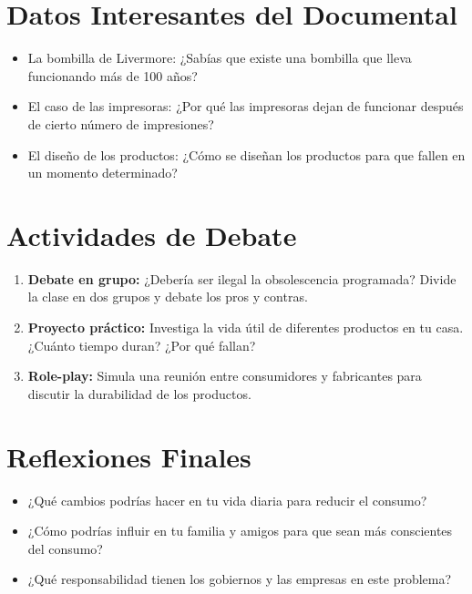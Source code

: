 \documentclass[12pt,a4paper]{article}
\begin{document}
\section{Datos Interesantes del Documental}
\begin{itemize}
    \item La bombilla de Livermore: ¿Sabías que existe una bombilla que lleva funcionando más de 100 años?
    \item El caso de las impresoras: ¿Por qué las impresoras dejan de funcionar después de cierto número de impresiones?
    \item El diseño de los productos: ¿Cómo se diseñan los productos para que fallen en un momento determinado?
\end{itemize}

\section{Actividades de Debate}
\begin{enumerate}
    \item \textbf{Debate en grupo:} ¿Debería ser ilegal la obsolescencia programada? Divide la clase en dos grupos y debate los pros y contras.
    
    \item \textbf{Proyecto práctico:} Investiga la vida útil de diferentes productos en tu casa. ¿Cuánto tiempo duran? ¿Por qué fallan?
    
    \item \textbf{Role-play:} Simula una reunión entre consumidores y fabricantes para discutir la durabilidad de los productos.
\end{enumerate}

\section{Reflexiones Finales}
\begin{itemize}
    \item ¿Qué cambios podrías hacer en tu vida diaria para reducir el consumo?
    \item ¿Cómo podrías influir en tu familia y amigos para que sean más conscientes del consumo?
    \item ¿Qué responsabilidad tienen los gobiernos y las empresas en este problema?
\end{itemize}
\end{document}
